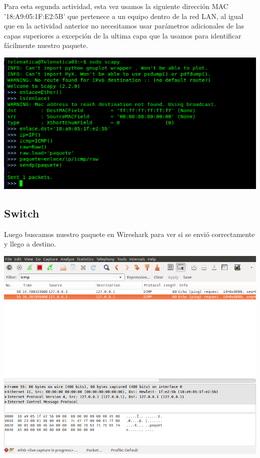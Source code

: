 \documentclass[spanish]{udpreport}
\begin{document}
Para esta segunda actividad, esta vez usamos la siguiente dirección MAC '18:A9:05:1F:E2:5B' que pertenece a un equipo dentro de la red LAN, al igual que en la actividad anterior no necesitamos usar parámetros adicionales de las capas superiores a excepción de la ultima capa que la usamos para identificar fácilmente nuestro paquete.

\begin{center}
	\includegraphics[scale=.37]{imagenes/Switch/Test_2.png}
\end{center}

\newpage
\subsection{Switch}

Luego buscamos nuestro paquete en Wireshark para ver si se envió correctamente y llego a destino.

\begin{center}
	\includegraphics[scale=.37]{imagenes/Switch/Test_2_Wireshark.png}
\end{center}
\end{document}
